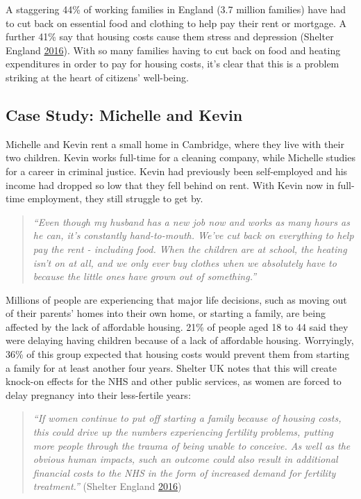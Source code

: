 \documentclass[]{tufte-handout}
\begin{document}
A staggering 44\% of working families in England (3.7 million families)
have had to cut back on essential food and clothing to help pay their
rent or mortgage. A further 41\% say that housing costs cause them
stress and depression (Shelter England
\protect\hyperlink{ref-ShelterEngland2016}{2016}). With so many families
having to cut back on food and heating expenditures in order to pay for
housing costs, it's clear that this is a problem striking at the heart
of citizens' well-being.

\hypertarget{case-study-michelle-and-kevin}{%
\subsection{Case Study: Michelle and
Kevin}\label{case-study-michelle-and-kevin}}

Michelle and Kevin rent a small home in Cambridge, where they live with
their two children. Kevin works full-time for a cleaning company, while
Michelle studies for a career in criminal justice. Kevin had previously
been self-employed and his income had dropped so low that they fell
behind on rent. With Kevin now in full-time employment, they still
struggle to get by.

\begin{quote}
\emph{``Even though my husband has a new job now and works as many hours
as he can, it's constantly hand-to-mouth. We've cut back on everything
to help pay the rent - including food. When the children are at school,
the heating isn't on at all, and we only ever buy clothes when we
absolutely have to because the little ones have grown out of
something.''}
\end{quote}

Millions of people are experiencing that major life decisions, such as
moving out of their parents' homes into their own home, or starting a
family, are being affected by the lack of affordable housing. 21\% of
people aged 18 to 44 said they were delaying having children because of
a lack of affordable housing. Worryingly, 36\% of this group expected
that housing costs would prevent them from starting a family for at
least another four years. Shelter UK notes that this will create
knock-on effects for the NHS and other public services, as women are
forced to delay pregnancy into their less-fertile years:

\begin{quote}
\emph{``If women continue to put off starting a family because of
housing costs, this could drive up the numbers experiencing fertility
problems, putting more people through the trauma of being unable to
conceive. As well as the obvious human impacts, such an outcome could
also result in additional financial costs to the NHS in the form of
increased demand for fertility treatment.''} (Shelter England
\protect\hyperlink{ref-ShelterEngland2016}{2016})
\end{quote}
\end{document}

